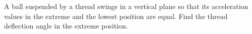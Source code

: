 \item A ball suspended by a thread swings in a vertical plane so that its acceleration values in the extreme and the lowest position are equal. Find the thread deflection angle in the extreme position.